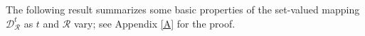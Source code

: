 The following result summarizes some basic properties of the set-valued mapping $\mathcal{D}_{\mathcal{R}}^{t}$ as $t$ and $\mathcal{R}$ vary; see Appendix \ref{A} for the proof. 

